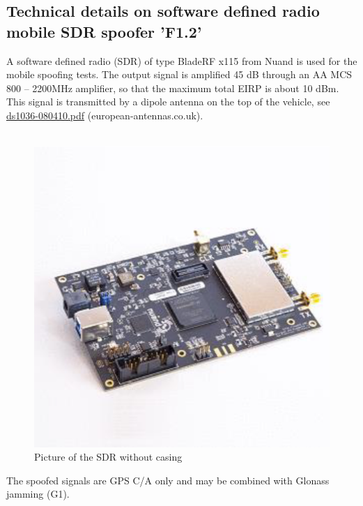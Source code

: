 \subsection{Technical details on software defined radio mobile SDR spoofer 'F1.2'}
A software defined radio (SDR) of type BladeRF x115 from Nuand is used for the mobile spoofing
tests. The output signal is amplified 45 dB through an AA MCS 800 – 2200MHz amplifier, so that the
maximum total EIRP is about 10 dBm. This signal is transmitted by a dipole antenna on the top of the
vehicle, see \href{https://www.european-antennas.co.uk/media/1900/ds1036-080410.pdf}{ds1036-080410.pdf} (european-antennas.co.uk). \\\\
\begin{figure}[hbt!]
    \includegraphics[scale=0.4]{graphics/appendixG/SDR.png}
    \caption{Picture of the SDR without casing}
\end{figure}

The spoofed signals are GPS C/A only and may be combined with Glonass jamming (G1).

